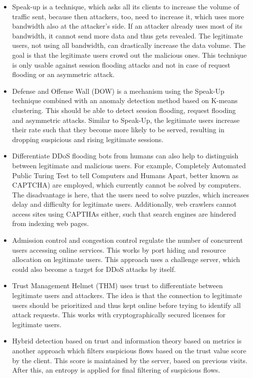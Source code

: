 \begin{itemize}
    \item Speak-up is a technique, which asks all its clients to increase the volume of traffic sent, because then attackers, too, need to increase it, which uses more bandwidth also at the attacker's side. If an attacker already uses most of its bandwidth, it cannot send more data and thus gets revealed. The legitimate users, not using all bandwidth, can drastically increase the data volume. The goal is that the legitimate users crowd out the malicious ones. This technique is only usable against session flooding attacks and not in case of request flooding or an asymmetric attack. 
    \item Defense and Offense Wall (DOW) is a mechanism using the Speak-Up technique combined with an anomaly detection method based on K-means clustering. This should be able to detect session flooding, request flooding and asymmetric attacks. Similar to Speak-Up, the legitimate users increase their rate such that they become more likely to be served, resulting in dropping suspicious and rising legitimate sessions. 
    \item Differentiate DDoS flooding bots from humans can also help to distinguish between legitimate and malicious users. For example, Completely Automated Public Turing Test to tell Computers and Humans Apart, better known as CAPTCHA) are employed, which currently cannot be solved by computers. The disadvantage is here, that the users need to solve puzzles, which increases delay and difficulty for legitimate users. Additionally, web crawlers cannot access sites using CAPTHAs either, such that search engines are hindered from indexing web pages. 
    \item Admission control and congestion control regulate the number of concurrent users accessing online services. This works by port hiding and resource allocation on legitimate users. This approach uses a challenge server, which could also become a target for DDoS attacks by itself. 
    \item Trust Management Helmet (THM) uses trust to differentiate between legitimate users and attackers. The idea is that the connection to legitimate users should be prioritized and thus kept online before trying to identify all attack requests. This works with cryptographically secured licenses for legitimate users. 
    \item Hybrid detection based on trust and information theory based on metrics is another approach which filters suspicious flows based on the trust value score by the client. This score is maintained by the server, based on previous visits. After this, an entropy is applied for final filtering of suspicious flows. 
\end{itemize}


